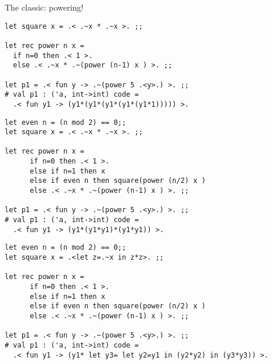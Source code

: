\documentclass[landscape]{slides}
\begin{document}
\begin{slide}
    The classic: powering!
\begin{verbatim}
let square x = .< .~x * .~x >. ;;

let rec power n x =
  if n=0 then .< 1 >.
  else .< .~x * .~(power (n-1) x ) >. ;;

let p1 = .< fun y -> .~(power 5 .<y>.) >. ;;
# val p1 : ('a, int->int) code = 
  .< fun y1 -> (y1*(y1*(y1*(y1*(y1*1))))) >.
\end{verbatim}
\end{slide}

\begin{slide}
\begin{verbatim}
let even n = (n mod 2) == 0;;
let square x = .< .~x * .~x >. ;;

let rec power n x =
      if n=0 then .< 1 >.
      else if n=1 then x
      else if even n then square(power (n/2) x )
      else .< .~x * .~(power (n-1) x ) >. ;;

let p1 = .< fun y -> .~(power 5 .<y>.) >. ;;
# val p1 : ('a, int->int) code = 
  .< fun y1 -> (y1*(y1*y1)*(y1*y1)) >.
\end{verbatim}
\end{slide}

\begin{slide}
\begin{verbatim}
let even n = (n mod 2) == 0;;
let square x = .<let z=.~x in z*z>. ;;

let rec power n x =
      if n=0 then .< 1 >.
      else if n=1 then x
      else if even n then square(power (n/2) x )
      else .< .~x * .~(power (n-1) x ) >. ;;

let p1 = .< fun y -> .~(power 5 .<y>.) >. ;;
# val p1 : ('a, int->int) code = 
  .< fun y1 -> (y1* let y3= let y2=y1 in (y2*y2) in (y3*y3)) >.
\end{verbatim}
\end{slide}
\end{document}
